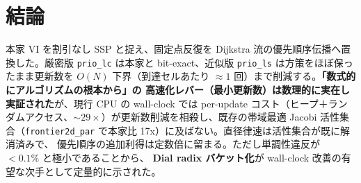 \documentclass[11pt]{article}
\begin{document}
\section{結論}
本家 VI を割引なし SSP と捉え、固定点反復を Dijkstra 流の優先順序伝播へ置換した。厳密版
\texttt{prio\_lc} は本家と bit-exact、近似版 \texttt{prio\_ls} は方策をほぼ保ったまま更新数を $O(N)$
下界（到達セルあたり $\approx1$ 回）まで削減する。\textbf{「数式的にアルゴリズムの根本から」の
高速化レバー（最小更新数）は数理的に実在し実証された}が、現行 CPU の wall-clock では per-update
コスト（ヒープ＋ランダムアクセス、$\sim29\times$）が更新数削減を相殺し、既存の帯域最適 Jacobi
活性集合（\texttt{frontier2d\_par} で本家比 17x）に及ばない。直径律速は活性集合が既に解消済みで、
優先順序の追加利得は定数倍に留まる。ただし単調性違反が $<0.1\%$ と極小であることから、
\textbf{Dial radix バケット化}が wall-clock 改善の有望な次手として定量的に示された。
\end{document}
